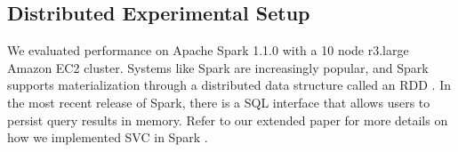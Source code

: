 \subsection{Distributed Experimental Setup}
We evaluated performance on Apache Spark 1.1.0 with a 10 node r3.large Amazon EC2 cluster.
Systems like Spark are increasingly popular, and Spark supports materialization through a distributed data structure called an RDD \cite{zaharia2012resilient}.
In the most recent release of Spark, there is a SQL interface that allows users to persist query results in memory.
Refer to our extended paper for more details on how we implemented SVC in Spark .

